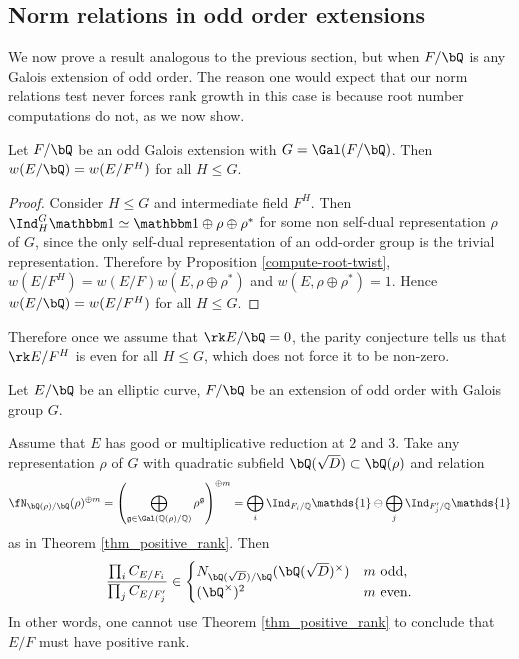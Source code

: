 \subsection{Norm relations in odd order extensions}

We now prove a result analogous to the previous section, but when $F / \bQ$ is any Galois extension of odd order. The reason one would expect that our norm relations test never forces rank growth in this case is because root number computations do not, as we now show.

\begin{lemma}
 Let $F / \bQ$ be an odd Galois extension with $G = \Gal(F / \bQ)$. Then $w(E / \bQ) = w(E / F^H)$ for all $H \leq G$. 
\end{lemma}

\begin{proof}
Consider $H \leq G$ and intermediate field $F^H$. Then 
$\Ind_H^G \trivial \simeq \trivial \oplus 
\rho \oplus \rho^*$ for some non self-dual representation $\rho$ of $G$, since the only self-dual representation of an odd-order group is the trivial representation. Therefore by Proposition \ref{compute-root-twist}, $w(E / F^H) = w(E / F)w(E, \rho \oplus \rho^*)$ and $w(E, \rho \oplus \rho^*) = 1$. Hence $w(E / \bQ) = w(E / F^H)$ for all $H \leq G$. 
\end{proof}

Therefore once we assume that $\rk E / \bQ = 0$, the parity conjecture tells us that $\rk E / F^H$ is even for all $H \leq G$, which does not force it to be non-zero. 


\begin{thm}\label{odd-exts}
 Let $E / \bQ$ be an elliptic curve, $F / \bQ$ be an extension of odd order with Galois group $G$. 
 
Assume that $E$ has good or multiplicative reduction at $2$ and $3$. 
Take any representation $\rho$ of $G$ with quadratic subfield $\bQ(\sqrt{D}) \subset \bQ(\rho)$ and relation
\begin{equation*}\label{odd-exp} \repnorm{\rho}^{\oplus m} =
 \left(\bigoplus_{\mathfrak{g}\in\Gal(\QQ(\rho)/\QQ)}\rho^{\mathfrak{g}}\right)^{\oplus m }=\bigoplus_i\Ind_{F_i/\QQ}\mathds{1}\ominus\bigoplus_j\Ind_{F'_j/\QQ}\mathds{1}
\end{equation*}
 as in Theorem \ref{thm_positive_rank}. Then
 \[ \frac{\prod_i C_{E/F_i}}{\prod_j C_{E/F_j'}}  \in 
    \begin{cases}
        N_{\bQ(\sqrt{D}) / \bQ}(\bQ(\sqrt{D})^{\times}) & m \ \text{odd}, \\
        (\bQ^{\times})^2 & m \ \text{even}.
    \end{cases} \] 
    In other words, one cannot use Theorem \ref{thm_positive_rank} to conclude that $E / F$ must have positive rank. 
\end{thm}

